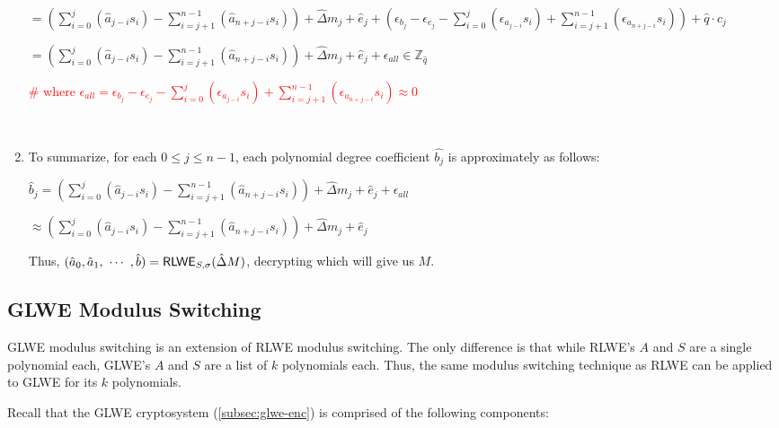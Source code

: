 \begin{enumerate}
$=  \left(\sum\limits_{i=0}^{j}(\hat{a}_{j-i}s_i) 
- \sum\limits_{i=j+1}^{n-1}(\hat{a}_{n+j-i}s_i)\right)
+ \hat{\Delta} m_j + \hat{e}_j 
+ \left(\epsilon_{b_j} - \epsilon_{e_j}
- \sum\limits_{i=0}^{j}(\epsilon_{a_{j-i}} s_i)
+ \sum\limits_{i=j+1}^{n-1}(\epsilon_{a_{n+j-i}} s_i)\right) + \hat{q} \cdot c_j
$

$=  \left(\sum\limits_{i=0}^{j}(\hat{a}_{j-i}s_i) 
- \sum\limits_{i=j+1}^{n-1}(\hat{a}_{n+j-i}s_i)\right)
+ \hat{\Delta} m_j + \hat{e}_j 
+ \epsilon_{all} \in \mathbb{Z}_{\hat{q}}
$

\textcolor{red}{ \# where $\epsilon_{all} = \epsilon_{b_j} - \epsilon_{e_j}
- \sum\limits_{i=0}^{j}(\epsilon_{a_{j-i}} s_i)
+ \sum\limits_{i=j+1}^{n-1}(\epsilon_{a_{n+j-i}} s_i) \approx 0$}


$ $

\item To summarize, for each $0 \leq j \leq n-1 $, each polynomial degree coefficient $\hat{b_j}$ is approximately as follows:

$\hat{b}_j =  \left(\sum\limits_{i=0}^{j}(\hat{a}_{j-i}s_i) 
- \sum\limits_{i=j+1}^{n-1}(\hat{a}_{n+j-i}s_i)\right)
+ \hat{\Delta} m_j + \hat{e}_j 
+ \epsilon_{all}$

$ \approx \left(\sum\limits_{i=0}^{j}(\hat{a}_{j-i}s_i) 
- \sum\limits_{i=j+1}^{n-1}(\hat{a}_{n+j-i}s_i)\right)
+ \hat{\Delta} m_j + \hat{e}_j$

Thus, $(\hat{a}_0, \hat{a}_1, \text{ } \text{$\cdots$} \text{ }, \hat{b}) = \textsf{RLWE}_{{S},\sigma}(\hat{\Delta}  M)$, decrypting which will give us $M$.

\begin{flushright}
\qedsymbol{} 
\end{flushright}

\end{enumerate}




\subsection{GLWE Modulus Switching}
\label{subsec:modulus-switch-glwe}

GLWE modulus switching is an extension of RLWE modulus switching. The only difference is that while RLWE's $A$ and $S$ are a single polynomial each, GLWE's $A$ and $S$ are a list of $k$ polynomials each. Thus, the same modulus switching technique as RLWE can be applied to GLWE for its $k$ polynomials.  

Recall that the GLWE cryptosystem (\autoref{subsec:glwe-enc}) is comprised of the following components:

